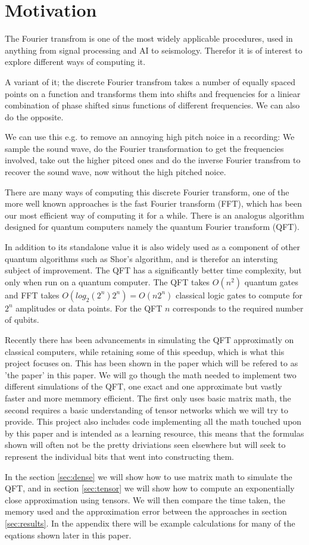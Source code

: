 \section{Motivation}
The Fourier transfrom is one of the most widely applicable procedures, used in anything from signal processing and AI to seismology. Therefor it is of interest to explore different ways of computing it. 


A variant of it; the discrete Fourier transfrom takes a number of equally spaced points on a function 
and transforms them into shifts and frequencies for a liniear combination of phase shifted sinus functions of different frequencies. 
We can also do the opposite. 


We can use this e.g. to remove an annoying high pitch noice in a recording: 
We sample the sound wave, do the Fourier transformation to get the frequencies involved, 
take out the higher pitced ones and do the inverse Fourier transfrom to recover the sound wave, now without the high pitched noice. 


There are many ways of computing this discrete Fourier transform,
one of the more well known approaches is the fast Fourier transform (FFT), which has been our most efficient way of computing it for a while. 
There is an analogus algorithm designed for quantum computers namely the quantum Fourier transform (QFT). 


In addition to its standalone value it is also widely used as a component of other quantum algorithms such as Shor's algorithm, and is therefor an intersting subject of improvement. 
The QFT has a significantly better time complexity, but only when run on a quantum computer. The QFT takes $O(n^2)$ quantum gates and FFT takes $O(log_{2}(2^n) 2^n) = O(n2^n)$\cite{FFT_logic_gates} classical logic gates to compute for $2^n$ amplitudes or data points. For the QFT $n$ corresponds to the required number of qubits. 


Recently there has been advancements in simulating the QFT approximatly on classical computers, while retaining some of this speedup, which is what this project focuses on. This has been shown in the paper\cite{the_paper} which will be refered to as 'the paper' in this paper. We will go though the math needed to implement two different simulations of the QFT, one exact and one approximate but vastly faster and more memmory efficient. The first only uses basic matrix math, the second requires a basic understanding of tensor networks which we will try to provide. This project also includes code implementing all the math touched upon by this paper and is intended as a learning resource, this means that the formulas shown will often not be the pretty driviations seen elsewhere but will seek to represent the individual bits that went into constructing them. 


In the section \ref{sec:dense} we will show how to use matrix math to simulate the QFT, and in section \ref{sec:tensor} we will show how to compute an exponentially close approximation using tensors. We will then compare the time taken, the memory used and the approximation error between the approaches in section \ref{sec:results}. In the appendix there will be example calculations for many of the eqations shown later in this paper. 

